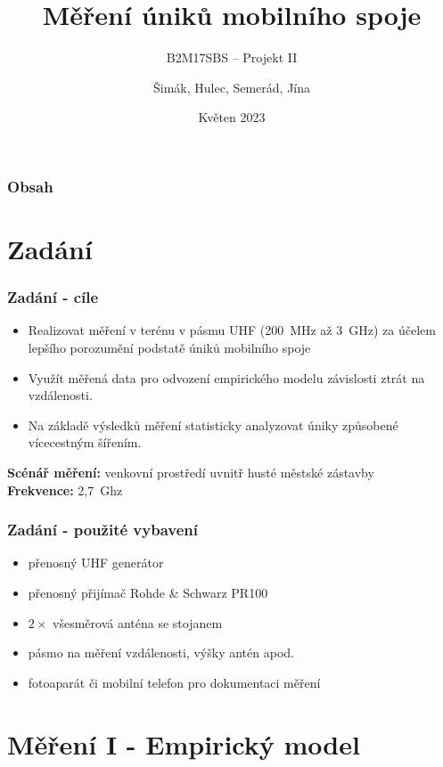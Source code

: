 \documentclass[aspectratio=169, 12pt, hyperref={unicode}]{beamer}
\title{Měření úniků mobilního spoje}
\subtitle{B2M17SBS -- Projekt II}
\author{Šimák, Hulec, Semerád, Jína}
\date{Květen 2023}
\begin{document}

\begin{frame}
	\titlepage
\end{frame}

\begin{frame}
	\frametitle{Obsah}
	\tableofcontents
\end{frame}

\section{Zadání}
	\begin{frame}
	\frametitle{Zadání - cíle}
	\begin{itemize}
		\item Realizovat měření v terénu v pásmu UHF (200~MHz až 3~GHz) za účelem lepšího porozumění podstatě úniků mobilního spoje
		\item Využít měřená data pro odvození empirického modelu závislosti ztrát na vzdálenosti.
		\item Na základě výsledků měření statisticky analyzovat úniky způsobené vícecestným šířením.
	\end{itemize}
	\vspace*{5pt}
	\textbf{Scénář měření:} venkovní prostředí uvnitř husté městské zástavby\\
	\textbf{Frekvence:} 2,7~Ghz
	\end{frame}

	\begin{frame}
	\frametitle{Zadání - použité vybavení}
	\begin{itemize}
		\item přenosný UHF generátor
		\item přenosný přijímač Rohde \& Schwarz PR100
		\item $2\times$ všesměrová anténa se stojanem
		\item pásmo na měření vzdálenosti, výšky antén apod.
		\item fotoaparát či mobilní telefon pro dokumentaci měření
	\end{itemize}
	\end{frame}

\section{Měření I - Empirický model}
\end{document}
